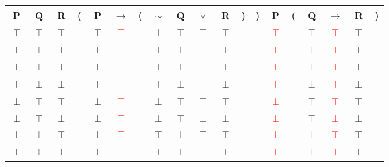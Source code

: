\documentclass[11pt]{article}
\begin{document}
\begin{tabular}{ c  c  c | c  c  c  c  c  c  c  c  c  c | c | c  c  c  c  c }
P & Q & R & ( & P & $\rightarrow$ & ( & $\sim$ & Q & $\lor$ & R & ) & ) & P & ( & Q & $\rightarrow$ & R & )\\
\hline 
$\top$ & $\top$ & $\top$ &  & $\top$ & \textcolor{red}{$\top$} &  & $\perp$ & $\top$ & $\top$ & $\top$ &  &  & \textcolor{red}{$\top$} &  & $\top$ & \textcolor{red}{$\top$} & $\top$ & \\
$\top$ & $\top$ & $\perp$ &  & $\top$ & \textcolor{red}{$\perp$} &  & $\perp$ & $\top$ & $\perp$ & $\perp$ &  &  & \textcolor{red}{$\top$} &  & $\top$ & \textcolor{red}{$\perp$} & $\perp$ & \\
$\top$ & $\perp$ & $\top$ &  & $\top$ & \textcolor{red}{$\top$} &  & $\top$ & $\perp$ & $\top$ & $\top$ &  &  & \textcolor{red}{$\top$} &  & $\perp$ & \textcolor{red}{$\top$} & $\top$ & \\
$\top$ & $\perp$ & $\perp$ &  & $\top$ & \textcolor{red}{$\top$} &  & $\top$ & $\perp$ & $\top$ & $\perp$ &  &  & \textcolor{red}{$\top$} &  & $\perp$ & \textcolor{red}{$\top$} & $\perp$ & \\
$\perp$ & $\top$ & $\top$ &  & $\perp$ & \textcolor{red}{$\top$} &  & $\perp$ & $\top$ & $\top$ & $\top$ &  &  & \textcolor{red}{$\perp$} &  & $\top$ & \textcolor{red}{$\top$} & $\top$ & \\
$\perp$ & $\top$ & $\perp$ &  & $\perp$ & \textcolor{red}{$\top$} &  & $\perp$ & $\top$ & $\perp$ & $\perp$ &  &  & \textcolor{red}{$\perp$} &  & $\top$ & \textcolor{red}{$\perp$} & $\perp$ & \\
$\perp$ & $\perp$ & $\top$ &  & $\perp$ & \textcolor{red}{$\top$} &  & $\top$ & $\perp$ & $\top$ & $\top$ &  &  & \textcolor{red}{$\perp$} &  & $\perp$ & \textcolor{red}{$\top$} & $\top$ & \\
$\perp$ & $\perp$ & $\perp$ &  & $\perp$ & \textcolor{red}{$\top$} &  & $\top$ & $\perp$ & $\top$ & $\perp$ &  &  & \textcolor{red}{$\perp$} &  & $\perp$ & \textcolor{red}{$\top$} & $\perp$ & \\
\end{tabular}

\vspace{2em}
\end{document}
